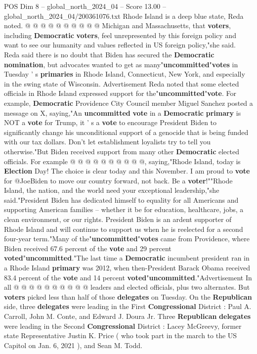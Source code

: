\begin{textsample}{POS Dim 8 – global\_north\_2024\_04 – Score 13.00 – global\_north\_2024\_04/200361076.txt}
Rhode Island is a deep blue state, Reda noted. @ @ @ @ @ @ @ @ @ @ Michigan and Massachusetts, that \textbf{voters}, including \textbf{Democratic} \textbf{voters}, feel unrepresented by this foreign policy and want to see our humanity and values reflected in US foreign policy,"she said.
Reda said there is no doubt that Biden has secured the \textbf{Democratic} \textbf{nomination}, but advocates wanted to get as many"\textbf{uncommitted}"\textbf{votes} in Tuesday ' s \textbf{primaries} in Rhode Island, Connecticut, New York, and especially in the swing state of Wisconsin.
Advertisement Reda noted that some elected officials in Rhode Island expressed support for the"\textbf{uncommitted}"\textbf{vote}.
For example, \textbf{Democratic} Providence City Council member Miguel Sanchez posted a message on X, saying,"An \textbf{uncommitted} \textbf{vote} in a \textbf{Democratic} \textbf{primary} is NOT a \textbf{vote} for Trump, it ' s a \textbf{vote} to encourage President Biden to significantly change his unconditional support of a genocide that is being funded with our tax dollars.
Don't let establishment loyalists try to tell you otherwise."But Biden received support from many other \textbf{Democratic} elected officials.
For example @ @ @ @ @ @ @ @ @ @, saying,"Rhode Island, today is \textbf{Election} Day!
The choice is clear today and this November.
I am proud to \textbf{vote} for @JoeBiden to move our country forward, not back.
Be a \textbf{voter}!""Rhode Island, the nation, and the world need your exceptional leadership,"she said."President Biden has dedicated himself to equality for all Americans and supporting American families -- whether it be for education, healthcare, jobs, a clean environment, or our rights.
President Biden is an ardent supporter of Rhode Island and will continue to support us when he is reelected for a second four-year term."Many of the"\textbf{uncommitted}"\textbf{votes} came from Providence, where Biden received 67.6 percent of the \textbf{vote} and 29 percent \textbf{voted}"\textbf{uncommitted}."The last time a \textbf{Democratic} incumbent president ran in a Rhode Island \textbf{primary} was 2012, when then-President Barack Obama received 83.4 percent of the \textbf{vote} and 14 percent \textbf{voted}"\textbf{uncommitted}."Advertisement In all @ @ @ @ @ @ @ @ @ @ leaders and elected officials, plus two alternates.
But \textbf{voters} picked less than half of those \textbf{delegates} on Tuesday.
On the \textbf{Republican} side, three \textbf{delegates} were leading in the First \textbf{Congressional} District : Paul A.
Carroll, John M.
Conte, and Edward J.
Doura Jr.
Three \textbf{Republican} \textbf{delegates} were leading in the Second \textbf{Congressional} District : Lacey McGreevy, former state Representative Justin K.
Price ( who took part in the march to the US Capitol on Jan. 6, 2021 ), and Sean M.
Todd.

\end{textsample}

